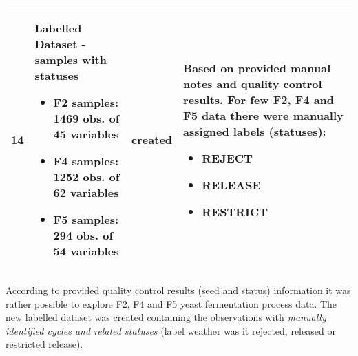 \begin{landscape}
\begin{center}
\begin{longtable}{l | p{5cm} | p{1.5cm} | p{10cm}}
14&	Labelled Dataset - samples with statuses 
\begin{itemize}
    \item F2 samples: 1469 obs. of 45 variables
    \item F4 samples: 1252 obs. of 62 variables
    \item F5 samples: 294 obs. of 54 variables
\end{itemize}
&created& 	
Based on provided manual notes and quality control results.  
For few F2, F4 and F5 data there were manually assigned labels (statuses): \begin{itemize}
    \item REJECT
    \item RELEASE
    \item RESTRICT
\end{itemize}
\\
\hline
\end{longtable}
\end{center}
\end{landscape}

According to provided quality control results (seed and status) information it was rather possible to explore F2, F4 and F5 yeast fermentation process data. The new labelled dataset was created containing the observations with \emph{manually identified cycles and related statuses} (label weather was it rejected, released or restricted release).